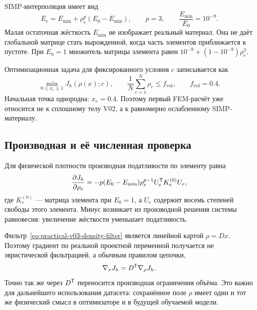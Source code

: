 SIMP-интерполяция имеет вид
\begin{equation}
\label{eq:practical-v03-simp-law}
 E_e
 =
 E_{\min}
 +
 \rho_e^p(E_0-E_{\min}),
 \qquad
 p=3,
 \qquad
 \frac{E_{\min}}{E_0}=10^{-9}.
\end{equation}
Малая остаточная жёсткость $E_{\min}$ не изображает реальный материал. Она не даёт глобальной матрице стать вырожденной, когда часть элементов приближается к пустоте. При $E_0=1$ множитель матрицы элемента равен $10^{-9}+(1-10^{-9})\rho_e^3$.

Оптимизационная задача для фиксированного условия $c$ записывается как
\begin{equation}
\label{eq:practical-v03-problem}
 \min_{0\leq x_e\leq1}
 J_h(\rho(x);c),
 \qquad
 \frac{1}{N}\sum_{e=1}^{N}\rho_e
 \leq
 f_{\mathrm{vol}},
 \qquad
 f_{\mathrm{vol}}=0.4.
\end{equation}
Начальная точка однородна: $x_e=0.4$. Поэтому первый FEM-расчёт уже относится не к сплошному телу V02, а к равномерно ослабленному SIMP-материалу.

\subsection{Производная и её численная проверка}
\label{subsec:practical-v03-gradient}

Для физической плотности производная податливости по элементу равна
\begin{equation}
\label{eq:practical-v03-physical-gradient}
 \frac{\partial J_h}{\partial\rho_e}
 =
 -p(E_0-E_{\min})
 \rho_e^{p-1}
 U_e^{\mathsf{T}}K_e^{(0)}U_e,
\end{equation}
где $K_e^{(0)}$ --- матрица элемента при $E_0=1$, а $U_e$ содержит восемь степеней свободы этого элемента. Минус возникает из производной решения системы равновесия: увеличение жёсткости уменьшает податливость.

Фильтр~\eqref{eq:practical-v03-density-filter} является линейной картой $\rho=Dx$. Поэтому градиент по реальной проектной переменной получается не эвристической фильтрацией, а обычным правилом цепочки,
\begin{equation}
\label{eq:practical-v03-chain-rule}
 \nabla_x J_h
 =
 D^{\mathsf{T}}\nabla_\rho J_h.
\end{equation}
Точно так же через $D^{\mathsf{T}}$ переносится производная ограничения объёма. Это важно для дальнейшего использования датасета: сохранённое поле $\rho$ имеет один и тот же физический смысл в оптимизаторе и в будущей обучаемой модели.


